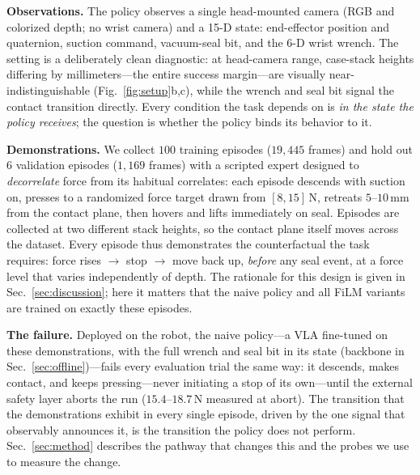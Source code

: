 \textbf{Observations.}
The policy observes a single head-mounted camera (RGB and colorized depth; no wrist camera) and a
15-D state: end-effector position and quaternion, suction command, vacuum-seal bit, and the 6-D
wrist wrench. The setting is a deliberately clean diagnostic: at head-camera range, case-stack
heights differing by millimeters---the entire success margin---are visually near-indistinguishable (Fig.~\ref{fig:setup}b,c), while the wrench and seal bit signal the contact transition
directly. Every condition the task depends on is \emph{in the state the policy receives}; the
question is whether the policy binds its behavior to it.

\textbf{Demonstrations.}
We collect $100$ training episodes ($19{,}445$ frames) and hold out $6$ validation episodes
($1{,}169$ frames) with a scripted expert designed to \emph{decorrelate} force from its habitual
correlates: each episode descends with suction on, presses to a randomized force target drawn
from $[8,15]$\,N, retreats $5$--$10$\,mm from the contact plane, then hovers and lifts
immediately on seal. Episodes are collected at two different stack heights, so the contact
plane itself moves across the dataset. Every episode thus demonstrates the counterfactual the task requires:
force rises $\rightarrow$ stop $\rightarrow$ move back up, \emph{before} any seal event, at a
force level that varies independently of depth. The rationale for this design is given in
Sec.~\ref{sec:discussion}; here it matters that the naive policy and
all FiLM variants are trained on exactly these episodes.

\textbf{The failure.}
Deployed on the robot, the naive policy---a VLA fine-tuned on these demonstrations, with the
full wrench and seal bit in its state (backbone in Sec.~\ref{sec:offline})---fails every evaluation trial
the same way: it descends, makes contact, and keeps pressing---never initiating a stop of its
own---until the external safety layer aborts the run ($15.4$--$18.7$\,N measured at abort).
The transition that the demonstrations exhibit in every single episode, driven by the one signal
that observably announces it, is the transition the policy does not perform. Sec.~\ref{sec:method}
describes the pathway that changes this and the probes we use to measure the change.
